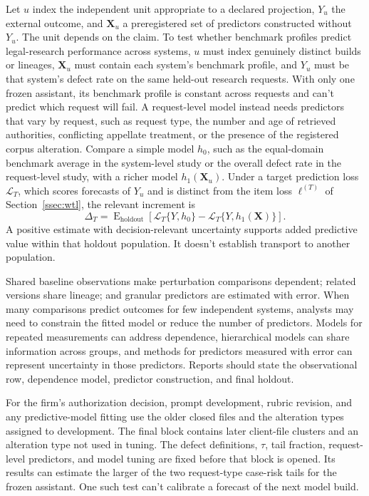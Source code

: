\documentclass[12pt]{article}
\begin{document}
Let \(u\) index the independent unit appropriate to a declared projection, \(Y_u\) the external outcome, and \(\mathbf X_u\) a preregistered set of predictors constructed without \(Y_u\). The unit depends on the claim. To test whether benchmark profiles predict legal-research performance across systems, \(u\) must index genuinely distinct builds or lineages, \(\mathbf X_u\) must contain each system's benchmark profile, and \(Y_u\) must be that system's defect rate on the same held-out research requests. With only one frozen assistant, its benchmark profile is constant across requests and can't predict which request will fail. A request-level model instead needs predictors that vary by request, such as request type, the number and age of retrieved authorities, conflicting appellate treatment, or the presence of the registered corpus alteration. Compare a simple model \(h_0\), such as the equal-domain benchmark average in the system-level study or the overall defect rate in the request-level study, with a richer model \(h_1(\mathbf X_u)\). Under a target prediction loss \(\mathcal L_T\), which scores forecasts of \(Y_u\) and is distinct from the item loss \(\ell^{(T)}\) of Section~\ref{ssec:wtl}, the relevant increment is
\[
\Delta_T
=\operatorname{E}_{\mathrm{holdout}}\!
\left[\mathcal L_T\{Y,h_0\}
      -\mathcal L_T\{Y,h_1(\mathbf X)\}\right].
\]
A positive estimate with decision-relevant uncertainty supports added predictive value within that holdout population. It doesn't establish transport to another population.

Shared baseline observations make perturbation comparisons dependent; related versions share lineage; and granular predictors are estimated with error. When many comparisons predict outcomes for few independent systems, analysts may need to constrain the fitted model or reduce the number of predictors. Models for repeated measurements can address dependence, hierarchical models can share information across groups, and methods for predictors measured with error can represent uncertainty in those predictors. Reports should state the observational row, dependence model, predictor construction, and final holdout.

For the firm's authorization decision, prompt development, rubric revision, and any predictive-model fitting use the older closed files and the alteration types assigned to development. The final block contains later client-file clusters and an alteration type not used in tuning. The defect definitions, \(\tau\), tail fraction, request-level predictors, and model tuning are fixed before that block is opened. Its results can estimate the larger of the two request-type case-risk tails for the frozen assistant. One such test can't calibrate a forecast of the next model build.
\end{document}
